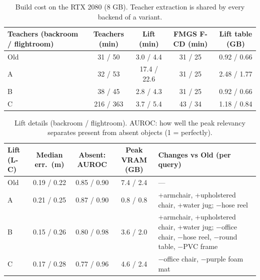 \documentclass[11pt,a4paper]{article}
\begin{document}
\begin{table}[ht]
\centering\small
\begin{tabular}{@{}lcccc@{}}
\toprule
Teachers (backroom / flightroom) & Teachers (min) & Lift (min) & FMGS F-CD (min) & Lift table (GB) \\
\midrule
Old  & 31 / 50   & 3.0 / 4.4   & 31 / 25 & 0.92 / 0.66 \\
A    & 32 / 53   & 17.4 / 22.6 & 31 / 25 & 2.48 / 1.77 \\
B    & 38 / 45   & 2.8 / 4.3   & 31 / 25 & 0.92 / 0.66 \\
C    & 216 / 363 & 3.7 / 5.4   & 43 / 34 & 1.18 / 0.84 \\
\bottomrule
\end{tabular}
\caption{Build cost on the RTX 2080 (8 GB). Teacher extraction is shared by every backend of a variant.}
\end{table}

\begin{table}[ht]
\centering\small
\begin{tabularx}{\linewidth}{@{}lcccL@{}}
\toprule
Lift (L-C) & Median err.\ (m) & Absent: AUROC & Peak VRAM (GB) & Changes vs Old (per query) \\
\midrule
Old  & 0.19 / 0.22 & 0.85 / 0.90 & 7.4 / 2.4 & --- \\
A    & 0.21 / 0.25 & 0.87 / 0.90 & 0.8 / 0.8 & +armchair, +upholstered chair, +water jug; $-$hose reel \\
B    & 0.15 / 0.26 & 0.80 / 0.98 & 3.6 / 2.0 & +armchair, +upholstered chair, +water jug; $-$office chair, $-$hose reel, $-$round table, $-$PVC frame \\
C    & 0.17 / 0.28 & 0.77 / 0.96 & 4.6 / 2.4 & $-$office chair, $-$purple foam mat \\
\bottomrule
\end{tabularx}
\caption{Lift details (backroom / flightroom). AUROC: how well the peak relevancy separates present from absent
objects (1 = perfectly).}
\end{table}

\FloatBarrier
\end{document}
